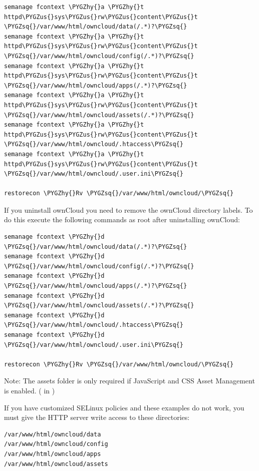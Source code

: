 \documentclass[letterpaper,10pt,english]{sphinxmanual}
\def\PYGZus{\char`\_}
\def\PYGZhy{\char`\-}
\def\PYGZsq{\char`\'}
\begin{document}
\begin{Verbatim}[commandchars=\\\{\}]
semanage fcontext \PYGZhy{}a \PYGZhy{}t httpd\PYGZus{}sys\PYGZus{}rw\PYGZus{}content\PYGZus{}t \PYGZsq{}/var/www/html/owncloud/data(/.*)?\PYGZsq{}
semanage fcontext \PYGZhy{}a \PYGZhy{}t httpd\PYGZus{}sys\PYGZus{}rw\PYGZus{}content\PYGZus{}t \PYGZsq{}/var/www/html/owncloud/config(/.*)?\PYGZsq{}
semanage fcontext \PYGZhy{}a \PYGZhy{}t httpd\PYGZus{}sys\PYGZus{}rw\PYGZus{}content\PYGZus{}t \PYGZsq{}/var/www/html/owncloud/apps(/.*)?\PYGZsq{}
semanage fcontext \PYGZhy{}a \PYGZhy{}t httpd\PYGZus{}sys\PYGZus{}rw\PYGZus{}content\PYGZus{}t \PYGZsq{}/var/www/html/owncloud/assets(/.*)?\PYGZsq{}
semanage fcontext \PYGZhy{}a \PYGZhy{}t httpd\PYGZus{}sys\PYGZus{}rw\PYGZus{}content\PYGZus{}t \PYGZsq{}/var/www/html/owncloud/.htaccess\PYGZsq{}
semanage fcontext \PYGZhy{}a \PYGZhy{}t httpd\PYGZus{}sys\PYGZus{}rw\PYGZus{}content\PYGZus{}t \PYGZsq{}/var/www/html/owncloud/.user.ini\PYGZsq{}

restorecon \PYGZhy{}Rv \PYGZsq{}/var/www/html/owncloud/\PYGZsq{}
\end{Verbatim}

If you uninstall ownCloud you need to remove the ownCloud directory labels. To do
this execute the following commands as root after uninstalling ownCloud:

\begin{Verbatim}[commandchars=\\\{\}]
semanage fcontext \PYGZhy{}d \PYGZsq{}/var/www/html/owncloud/data(/.*)?\PYGZsq{}
semanage fcontext \PYGZhy{}d \PYGZsq{}/var/www/html/owncloud/config(/.*)?\PYGZsq{}
semanage fcontext \PYGZhy{}d \PYGZsq{}/var/www/html/owncloud/apps(/.*)?\PYGZsq{}
semanage fcontext \PYGZhy{}d \PYGZsq{}/var/www/html/owncloud/assets(/.*)?\PYGZsq{}
semanage fcontext \PYGZhy{}d \PYGZsq{}/var/www/html/owncloud/.htaccess\PYGZsq{}
semanage fcontext \PYGZhy{}d \PYGZsq{}/var/www/html/owncloud/.user.ini\PYGZsq{}

restorecon \PYGZhy{}Rv \PYGZsq{}/var/www/html/owncloud/\PYGZsq{}
\end{Verbatim}

Note: The assets folder is only required if JavaScript and CSS Asset Management is enabled. ( in )

If you have customized SELinux policies and these examples do not work, you must give the
HTTP server write access to these directories:

\begin{Verbatim}[commandchars=\\\{\}]
/var/www/html/owncloud/data
/var/www/html/owncloud/config
/var/www/html/owncloud/apps
/var/www/html/owncloud/assets
\end{Verbatim}
\end{document}
